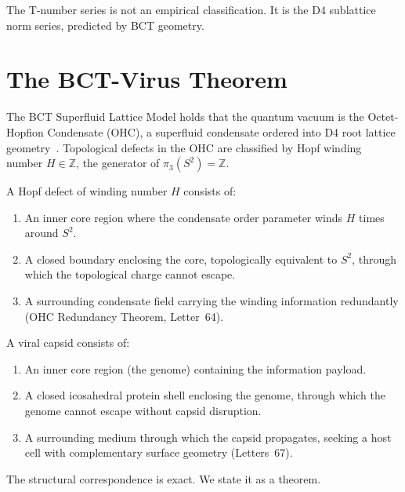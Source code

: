 \documentclass[aps,prl,preprint,superscriptaddress,floatfix]{revtex4-2}
\begin{document}
The T-number series is not an empirical classification. It is the
D4 sublattice norm series, predicted by BCT geometry.

\section{The BCT-Virus Theorem}

The BCT Superfluid Lattice Model holds that the quantum vacuum is
the Octet-Hopfion Condensate (OHC), a superfluid condensate ordered
into D4 root lattice geometry~\cite{bctjh}. Topological defects in
the OHC are classified by Hopf winding number $H \in \mathbb{Z}$,
the generator of $\pi_3(S^2) = \mathbb{Z}$.

A Hopf defect of winding number $H$ consists of:
\begin{enumerate}
\item An inner core region where the condensate order parameter
  winds $H$ times around $S^2$.
\item A closed boundary enclosing the core, topologically equivalent
  to $S^2$, through which the topological charge cannot escape.
\item A surrounding condensate field carrying the winding information
  redundantly (OHC Redundancy Theorem, Letter~64).
\end{enumerate}

A viral capsid consists of:
\begin{enumerate}
\item An inner core region (the genome) containing the information
  payload.
\item A closed icosahedral protein shell enclosing the genome,
  through which the genome cannot escape without capsid disruption.
\item A surrounding medium through which the capsid propagates,
  seeking a host cell with complementary surface geometry (Letters~67).
\end{enumerate}

The structural correspondence is exact. We state it as a theorem.
\end{document}
